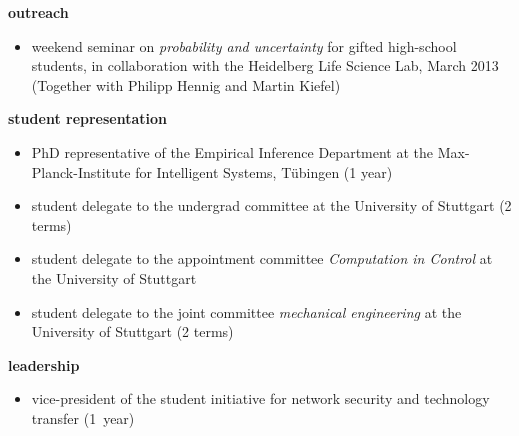 \documentclass[]{k-cv} %
\begin{document}
{\Large \bfseries outreach}
\begin{itemize}
 \item weekend seminar on \emph{probability and uncertainty} for gifted
high-school students, in collaboration with the Heidelberg Life Science Lab,
March 2013 (Together with Philipp Hennig and Martin Kiefel)
\end{itemize}

{\Large \bfseries student representation}
\begin{itemize}
 \item PhD representative of the Empirical Inference Department at the
Max-Planck-Institute for Intelligent Systems, T\"ubingen (1 year)
 \item student delegate to the undergrad committee at the University of
Stuttgart (2 terms)
\item student delegate to the appointment committee \emph{Computation in
Control} at the University of Stuttgart
\item student delegate to the joint committee \emph{mechanical engineering} at
the University of Stuttgart (2 terms)
\end{itemize}

{\Large \bfseries leadership}
\begin{itemize}
 \item vice-president of the student initiative for network security and
technology transfer (1~year)
\end{itemize}

%
%
\end{document}
